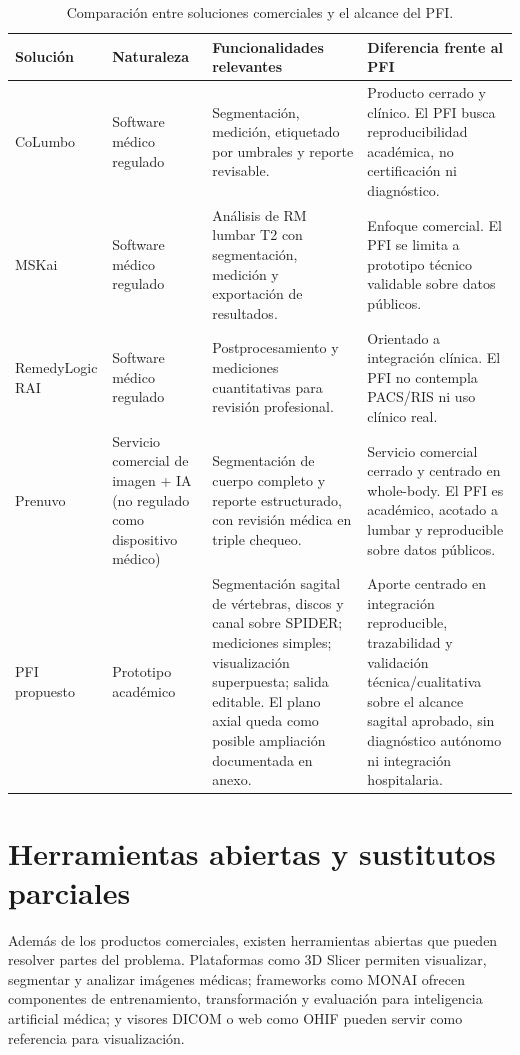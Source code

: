 \begin{table}[htbp]
\centering
\caption{Comparación entre soluciones comerciales y el alcance del PFI.}
\label{tab:comparacion_soluciones_comerciales}
\small
\begin{tabularx}{\textwidth}{p{} p{} X p{}}
\hline
\textbf{Solución} & \textbf{Naturaleza} & \textbf{Funcionalidades relevantes} & \textbf{Diferencia frente al PFI} \\
\hline
CoLumbo & Software médico regulado & Segmentación, medición, etiquetado por umbrales y reporte revisable. & Producto cerrado y clínico. El PFI busca reproducibilidad académica, no certificación ni diagnóstico. \\
MSKai & Software médico regulado & Análisis de RM lumbar T2 con segmentación, medición y exportación de resultados. & Enfoque comercial. El PFI se limita a prototipo técnico validable sobre datos públicos. \\
RemedyLogic RAI & Software médico regulado & Postprocesamiento y mediciones cuantitativas para revisión profesional. & Orientado a integración clínica. El PFI no contempla PACS/RIS ni uso clínico real. \\
Prenuvo & Servicio comercial de imagen + IA (no regulado como dispositivo médico) & Segmentación de cuerpo completo y reporte estructurado, con revisión médica en triple chequeo. & Servicio comercial cerrado y centrado en whole-body. El PFI es académico, acotado a lumbar y reproducible sobre datos públicos. \\
PFI propuesto & Prototipo académico & Segmentación sagital de vértebras, discos y canal sobre SPIDER; mediciones simples; visualización superpuesta; salida editable. El plano axial queda como posible ampliación documentada en anexo. & Aporte centrado en integración reproducible, trazabilidad y validación técnica/cualitativa sobre el alcance sagital aprobado, sin diagnóstico autónomo ni integración hospitalaria. \\
\hline
\end{tabularx}
\end{table}

\section{Herramientas abiertas y sustitutos parciales}

Además de los productos comerciales, existen herramientas abiertas que pueden resolver partes del problema. Plataformas como 3D Slicer permiten visualizar, segmentar y analizar imágenes médicas; frameworks como MONAI ofrecen componentes de entrenamiento, transformación y evaluación para inteligencia artificial médica; y visores DICOM o web como OHIF pueden servir como referencia para visualización.

